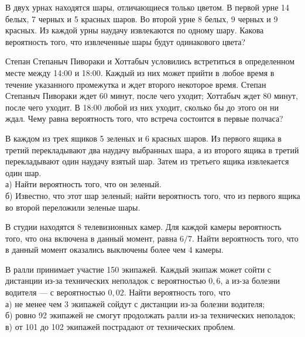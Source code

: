 \newpage\setcounter{zad}{0}



\begin{zkrW}{20}\noindent 
	В двух урнах находятся шары, отличающиеся только цветом. В первой урне 14 белых, 7 черных и 5 красных шаров. Во второй урне 8 белых, 9 черных и 9 красных. Из каждой урны наудачу извлекаются по одному шару. Какова вероятность того, что извлеченные шары будут одинакового цвета?
 
\end{zkrW}

\begin{zkrW}{20}\noindent 
	Степан Степаныч Пивораки и Хоттабыч условились встретиться в определенном месте между 14:00 и 18:00. Каждый из них может прийти в любое время в течение указанного промежутка и ждет второго некоторое время. Степан Степаныч Пивораки ждет 60 минут, после чего уходит; Хоттабыч ждет 80 минут, после чего уходит. В 18:00 любой из них уходит, сколько бы до этого он ни ждал. Чему равна вероятность того, что встреча состоится в первые полчаса?
 
\end{zkrW}

\begin{zkrW}{20}\noindent 
	В каждом из трех ящиков 5 зеленых и 6 красных шаров. Из первого ящика в третий перекладывают два наудачу выбранных шара, а из второго ящика в третий перекладывают один наудачу взятый шар. Затем из третьего ящика извлекается один шар. \\ \indent а) Найти вероятность того, что он зеленый. \\ \indent б) Известно, что этот шар зеленый; найти вероятность того, что из первого ящика во второй переложили зеленые шары.
 
\end{zkrW}

\begin{zkrW}{20}\noindent 
	В студии находятся 8 телевизионных камер. Для каждой камеры вероятность того, что она включена в данный момент, равна $6/7$. Найти вероятность того, что в данный момент оказались выключены более чем 4 камеры.
 
\end{zkrW}

\begin{zkrW}{20}\noindent 
	В ралли принимает участие 150 экипажей. Каждый экипаж может сойти с дистанции из-за технических неполадок с вероятностью $0{,}6$, а из-за болезни водителя --- с вероятностью $0{,}02$. Найти вероятность того, что \\ \indent а) не менее чем 3 экипажей сойдут с дистанции из-за болезни водителя; \\ \indent б) ровно 92 экипажей не смогут продолжать ралли из-за технических неполадок; \\ \indent в) от 101 до 102 экипажей пострадают от технических проблем.
 
\end{zkrW}

